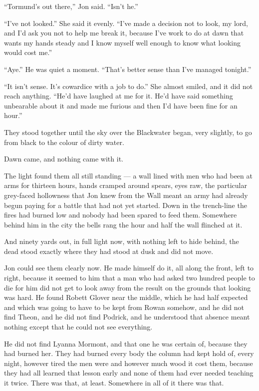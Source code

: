 “Tormund’s out there,” Jon said. “Isn’t he.”

“I’ve not looked.” She said it evenly. “I’ve made a decision not to look, my lord, and I’d ask you not to help me break it, because I’ve work to do at dawn that wants my hands steady and I know myself well enough to know what looking would cost me.”

“Aye.” He was quiet a moment. “That’s better sense than I’ve managed tonight.”

“It isn’t sense. It’s cowardice with a job to do.” She almost smiled, and it did not reach anything. “He’d have laughed at me for it. He’d have said something unbearable about it and made me furious and then I’d have been fine for an hour.”

They stood together until the sky over the Blackwater began, very slightly, to go from black to the colour of dirty water.

\sceneBreak

Dawn came, and nothing came with it.

The light found them all still standing — a wall lined with men who had been at arms for thirteen hours, hands cramped around spears, eyes raw, the particular grey-faced hollowness that Jon knew from the Wall meant an army had already begun paying for a battle that had not yet started. Down in the trench-line the fires had burned low and nobody had been spared to feed them. Somewhere behind him in the city the bells rang the hour and half the wall flinched at it.

And ninety yards out, in full light now, with nothing left to hide behind, the dead stood exactly where they had stood at dusk and did not move.

Jon could see them clearly now. He made himself do it, all along the front, left to right, because it seemed to him that a man who had asked two hundred people to die for him did not get to look away from the result on the grounds that looking was hard. He found Robett Glover near the middle, which he had half expected and which was going to have to be kept from Rowan somehow, and he did not find Theon, and he did not find Podrick, and he understood that absence meant nothing except that he could not see everything.

He did not find Lyanna Mormont, and that one he was certain of, because they had burned her. They had burned every body the column had kept hold of, every night, however tired the men were and however much wood it cost them, because they had all learned that lesson early and none of them had ever needed teaching it twice. There was that, at least. Somewhere in all of it there was that.

